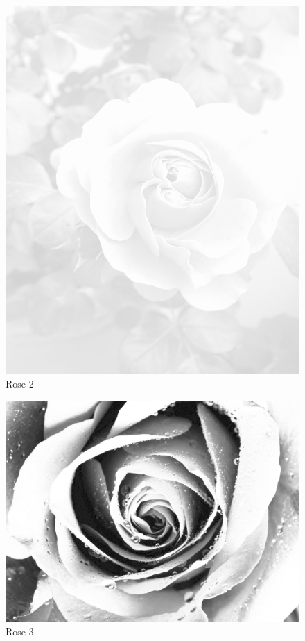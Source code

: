 \documentclass[ngerman,a4paper,11pt]{scrreprt}
\begin{document}
\begin{figure}[H]
\centering
\includegraphics[width=\textwidth,height=.8\textheight,keepaspectratio]{Bilder/Bilder/750_0010_14361_Hintergrund_Rose_2_Hell.png}
\caption{\label{img_Rose_2}Rose 2}
\end{figure}

\begin{figure}[H]
\centering
\includegraphics[width=\textwidth,height=.8\textheight,keepaspectratio]{Bilder/Bilder/750_0010_8140_750_0010_8137_rose_02_SW_hell.png}
\caption{\label{img_Rose_3}Rose 3}
\end{figure}
\end{document}
